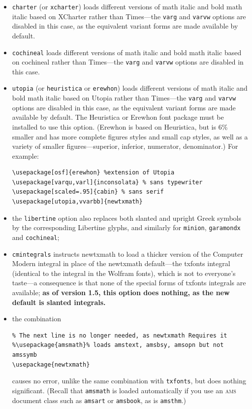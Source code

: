 \documentclass[11pt]{article}
\theoremstyle{oldplain}
\theoremstyle{plain}
\begin{document}
\begin{itemize}
\item {\tt charter} (or {\tt xcharter}) loads different versions of math italic and bold math italic based on \textsf{XCharter} rather than \textsf{Times}---the {\tt varg} and {\tt varvw} options are disabled in this case, as the equivalent variant forms are made available by default.
\item {\tt cochineal}  loads different versions of math italic and bold math italic based on \textsf{cochineal} rather than \textsf{Times}---the {\tt varg} and {\tt varvw} options are disabled in this case.
\item {\tt utopia} (or {\tt heuristica} or {\tt erewhon}) loads different versions of math italic and bold math italic based on \textsf{Utopia} rather than \textsf{Times}---the {\tt varg} and {\tt varvw} options are disabled in this case, as the equivalent variant forms are made available by default. The Heuristica or Erewhon font package must be installed to use this option. (Erewhon is based on Heuristica, but is 6\% smaller and has more complete figures styles and small cap styles, as well as a variety of smaller figures---superior, inferior, numerator, denominator.)  For example:
\begin{verbatim}
\usepackage[osf]{erewhon} %extension of Utopia
\usepackage[varqu,varl]{inconsolata} % sans typewriter
\usepackage[scaled=.95]{cabin} % sans serif
\usepackage[utopia,vvarbb]{newtxmath}
\end{verbatim}
\item the {\tt libertine} option also replaces both slanted and upright Greek  symbols by the corresponding Libertine glyphs, and similarly for {\tt minion}, {\tt garamondx} and {\tt cochineal};
\item
{\tt cmintegrals} instructs \textsf{newtxmath} to load a thicker version of the Computer Modern integral in place of the \textsf{newtxmath} default---the txfonts integral (identical to the integral in the Wolfram fonts), which is not to everyone's taste---a consequence is that none of the special forms of \textsf{txfonts} integrals are available;
\textbf{as of version 1.5, this option does nothing, as the new default is slanted integrals.}
\item the combination
\begin{verbatim}
% The next line is no longer needed, as newtxmath Requires it
%\usepackage{amsmath}% loads amstext, amsbsy, amsopn but not amssymb
\usepackage{newtxmath}
\end{verbatim}
causes no error, unlike the same combination with {\tt txfonts}, but does nothing significant. (Recall that {\tt amsmath} is loaded automatically if you use an \textsc{ams} document class such as {\tt amsart} or {\tt amsbook}, as is {\tt amsthm}.) 

\end{itemize}
\end{document}
